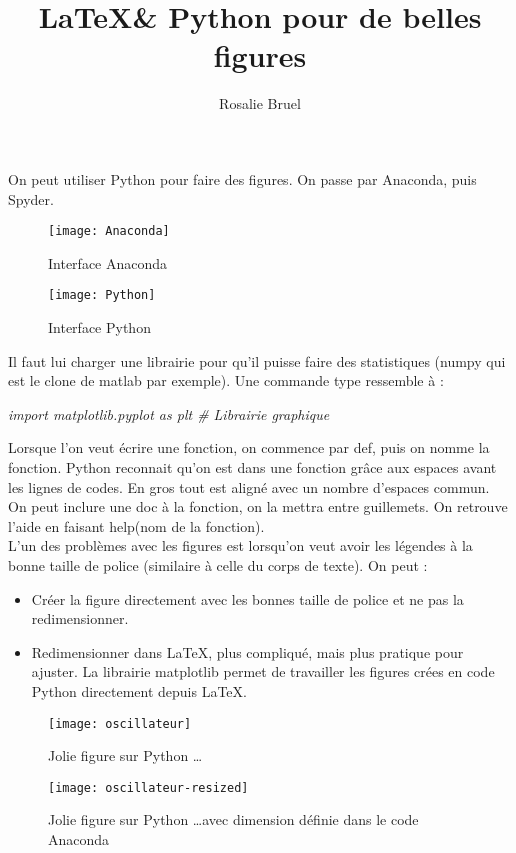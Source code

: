\documentclass[10pt,a4paper]{article}
\author{Rosalie Bruel}
\title{\LaTeX \& Python pour de belles figures}
\begin{document}
\maketitle
On peut utiliser Python pour faire des figures. On passe par Anaconda, puis Spyder.\\
\begin{figure}
\begin{center}
\texttt{[image: Anaconda]}
\caption{Interface Anaconda}
\end{center}
\end{figure}

\begin{figure}
\begin{center}
\texttt{[image: Python]}
\caption{Interface Python}
\end{center}
\end{figure}

Il faut lui charger une librairie pour qu'il puisse faire des statistiques (numpy qui est le clone de matlab par exemple). Une commande type ressemble à :
\begin{center}
\emph{import matplotlib.pyplot as plt \# Librairie graphique}
\end{center}
Lorsque l'on veut écrire une fonction, on commence par def, puis on nomme la fonction. Python reconnait qu'on est dans une fonction grâce aux espaces avant les lignes de codes. En gros tout est aligné avec un nombre d'espaces commun. On peut inclure une doc à la fonction, on la mettra entre guillemets. On retrouve l'aide en faisant help(nom de la fonction).\\
L'un des problèmes avec les figures est lorsqu'on veut avoir les légendes à la bonne taille de police (similaire à celle du corps de texte). On peut :
\begin{itemize}
\item Créer la figure directement avec les bonnes taille de police et ne pas la redimensionner.
\item Redimensionner dans \LaTeX, plus compliqué, mais plus pratique pour ajuster. La librairie matplotlib permet de travailler les figures crées en code Python directement depuis \LaTeX.
\end{itemize}



\lipsum[1-8]

\begin{figure}[htb]
\begin{center}
\texttt{[image: oscillateur]}
\caption{Jolie figure sur Python \ldots}
\end{center}
\end{figure}

\lipsum[1-8]

\begin{figure}[htb]
\begin{center}
\texttt{[image: oscillateur-resized]}
\caption{Jolie figure sur Python \ldots avec dimension définie dans le code Anaconda}
\end{center}
\end{figure}
\end{document}
